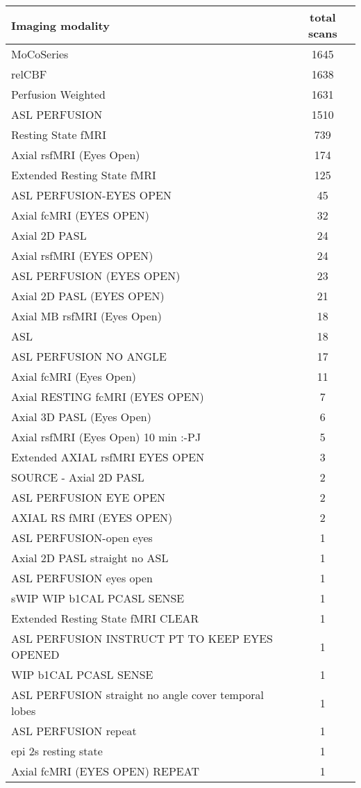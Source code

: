 		\begin{center}
			\begin{tabular}{l c}
				\hline
				\textbf{Imaging modality} & \textbf{total scans}\\
				\hline
				MoCoSeries&1645\\
				relCBF&1638\\
				Perfusion Weighted&1631\\
				ASL PERFUSION&1510\\
				Resting State fMRI&739\\
				Axial rsfMRI (Eyes Open)&174\\
				Extended Resting State fMRI&125\\
				ASL PERFUSION-EYES OPEN&45\\
				Axial fcMRI (EYES OPEN)&32\\
				Axial 2D PASL&24\\
				Axial rsfMRI (EYES OPEN)&24\\
				ASL PERFUSION (EYES OPEN)&23\\
				Axial 2D PASL (EYES OPEN)&21\\
				Axial MB rsfMRI (Eyes Open)&18\\
				ASL&18\\
				ASL PERFUSION NO ANGLE&17\\
				Axial fcMRI (Eyes Open)&11\\
				Axial RESTING fcMRI (EYES OPEN)&7\\
				Axial 3D PASL (Eyes Open)&6\\
				Axial rsfMRI (Eyes Open) 10 min :-PJ&5\\
				Extended AXIAL rsfMRI EYES OPEN&3\\
				SOURCE - Axial 2D PASL&2\\
				ASL PERFUSION EYE OPEN&2\\
				AXIAL RS fMRI (EYES OPEN)&2\\
				ASL PERFUSION-open eyes&1\\
				Axial 2D PASL straight no ASL&1\\
				ASL PERFUSION eyes open&1\\
				sWIP WIP b1CAL PCASL SENSE&1\\
				Extended Resting State fMRI CLEAR&1\\
				ASL PERFUSION   INSTRUCT PT TO KEEP EYES OPENED&1\\
				WIP b1CAL PCASL SENSE&1\\
				ASL PERFUSION straight no angle cover temporal lobes&1\\
				ASL PERFUSION repeat&1\\
				epi 2s resting state&1\\
				Axial fcMRI (EYES OPEN) REPEAT&1\\
			\end{tabular}{}
		\end{center}
		
